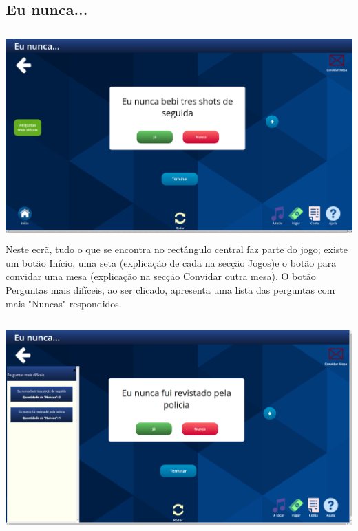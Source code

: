 \documentclass{article}
\begin{document}
\subsection{Eu nunca...}
\includegraphics[width=15cm, height=8cm]{user_manual_images/i_never_game.png}
Neste ecrã, tudo o que se encontra no rectângulo central faz parte do jogo; existe um botão Início, uma seta (explicação de cada na secção Jogos)e o botão para convidar uma mesa (explicação na secção Convidar outra mesa).
O botão Perguntas mais difíceis, ao ser clicado, apresenta uma lista das perguntas com mais "Nuncas" respondidos.\\\\
\includegraphics[width=15cm, height=8cm]{user_manual_images/hard_questions.png}
\end{document}
